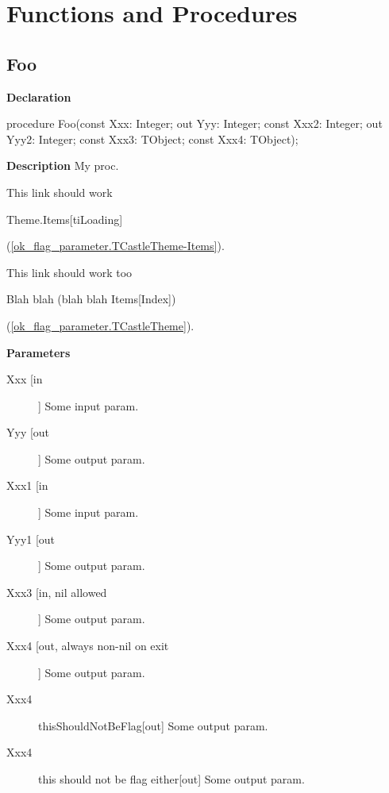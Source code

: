 \documentclass{report}
\newif\ifpdf
\begin{document}
\section{Functions and Procedures}
\ifpdf
\subsection*{\large{\textbf{Foo}}\normalsize\hspace{1ex}\hrulefill}
\else
\subsection*{Foo}
\fi
\label{ok_flag_parameter-Foo}
\begin{list}{}{
\setlength{\itemindent}{0cm}
\setlength{\listparindent}{0cm}
\setlength{\leftmargin}{\evensidemargin}
\addtolength{\leftmargin}{\tmplength}
\settowidth{\labelsep}{X}
\addtolength{\leftmargin}{\labelsep}
\setlength{\labelwidth}{\tmplength}
}
\item[\textbf{Declaration}\hfill]
\ifpdf
\begin{flushleft}
\fi
\begin{ttfamily}
procedure Foo(const Xxx: Integer; out Yyy: Integer; const Xxx2: Integer; out Yyy2: Integer; const Xxx3: TObject; const Xxx4: TObject);\end{ttfamily}

\ifpdf
\end{flushleft}
\fi

\par
\item[\textbf{Description}]
My proc.        

This link should work \begin{ttfamily}Theme.Items[tiLoading]\end{ttfamily}(\ref{ok_flag_parameter.TCastleTheme-Items}).

This link should work too \begin{ttfamily}Blah blah (blah blah Items[Index])\end{ttfamily}(\ref{ok_flag_parameter.TCastleTheme}).\par
\item[\textbf{Parameters}]
\begin{description}
\item[Xxx [in]] Some input param.
\item[Yyy [out]] Some output param.
\item[Xxx1 [in]] Some input param.
\item[Yyy1 [out]] Some output param.
\item[Xxx3 [in, nil allowed]] Some output param.
\item[Xxx4 [out, always non{-}nil on exit]] Some output param.
\item[Xxx4] thisShouldNotBeFlag[out] Some output param.
\item[Xxx4] this should not be flag either[out] Some output param.
\end{description}


\end{list}
\ifpdf
\end{document}
